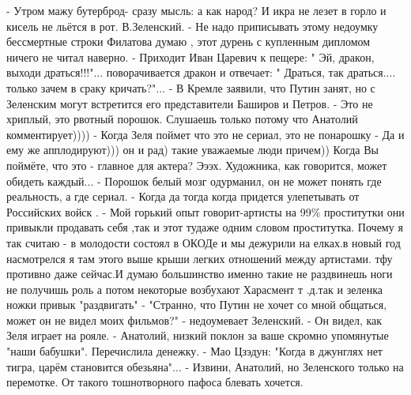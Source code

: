 - Утром мажу бутерброд- сразу мысль: а как народ? И икра не лезет в горло и кисель не льётся в рот. 
В.Зеленский.
- Не надо приписывать этому недоумку бессмертные строки Филатова
думаю , этот дурень с купленным дипломом  ничего не читал наверно.
- Приходит Иван Царевич к пещере: " Эй, дракон, выходи драться!!!"... поворачивается дракон и отвечает: " Драться, так драться.... только зачем в сраку кричать?"...
- В Кремле заявили, что Путин занят, но с Зеленским могут встретится его представители Баширов и Петров.
- Это не хриплый, это рвотный порошок. Слушаешь только потому что Анатолий комментирует))))
- Когда Зеля поймет что это не сериал, это не понарошку
- Да и ему же апплодируют))) он и рад) такие уважаемые люди причем)) Когда Вы поймёте, что это - главное для актера? Эээх. Художника, как говорится, может обидеть каждый...
- Порошок белый мозг одурманил, он не может понять где реальность, а где сериал.
- Когда да тогда когда придется улепетывать от Российских войск .
- Мой горький опыт говорит-артисты на 99\% проститутки они привыкли продавать себя ,так и этот тудаже одним словом проститутка.
Почему я так считаю - в молодости состоял в ОКОДе и мы дежурили на елках.в
новый год насмотрелся я там этого выше крыши легких отношений между артистами.
тфу противно даже сейчас.И думаю большинство именно такие не раздвинешь ноги не
получишь роль а потом некоторые возбухают Харасмент т .д.так и зеленка ножки
привык "раздвигать"
- "Странно, что Путин не хочет со мной общаться, может он не видел моих фильмов?" - недоумевает Зеленский.
- Он видел, как Зеля играет на рояле.
- Анатолий, низкий поклон за ваше скромно упомянутые "наши бабушки". Перечислила денежку.
- Мао Цзэдун: "Когда в джунглях нет тигра, царём становится обезьяна"...
- Извини, Анатолий, но Зеленского только на перемотке. От такого тошнотворного пафоса блевать хочется.


